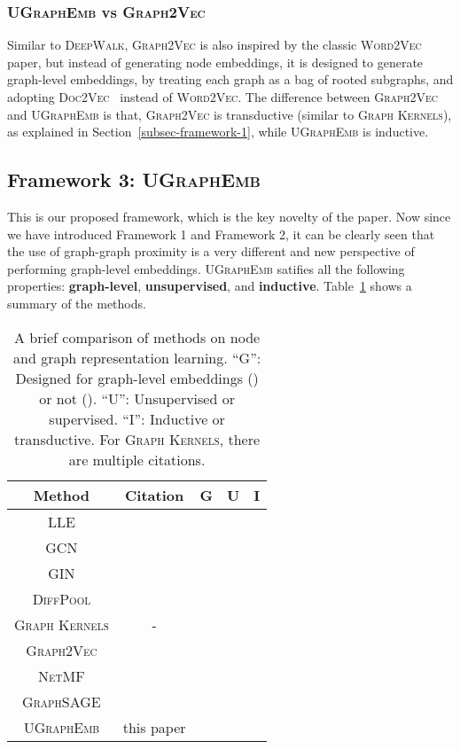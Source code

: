 \documentclass{article}
\newcommand{\model}{\textsc{UGraphEmb}\xspace}
\newcommand{\netmf}{\textsc{NetMF}\xspace}
\newcommand{\graphsage}{\textsc{GraphSAGE}\xspace}
\newcommand{\gk}{\textsc{Graph Kernels}\xspace}
\newcommand{\gv}{\textsc{Graph2Vec}\xspace}
\newcommand{\wv}{\textsc{Word2Vec}\xspace}
\newcommand{\gcn}{\textsc{GCN}\xspace}
\newcommand{\gin}{\textsc{GIN}\xspace}
\begin{document}
\subsubsection{\model vs \gv}

Similar to \textsc{DeepWalk}, \gv is also inspired by the classic \wv paper, but instead of generating node embeddings, it is designed to generate graph-level embeddings, by treating each graph as a bag of rooted subgraphs, and adopting \textsc{Doc2Vec}~\cite{mikolov2013distributed} instead of \wv. The difference between \gv and \model is that, \gv is transductive (similar to \gk), as explained in Section~\ref{subsec-framework-1}, while \model is inductive. 

\subsection{Framework 3: \model}

This is our proposed framework, which is the key novelty of the paper. Now since we have introduced Framework 1 and Framework 2, it can be clearly seen that the use of graph-graph proximity is a very different and new perspective of performing graph-level embeddings. \model satifies all the following properties: {\textbf{graph-level}}, {\textbf{unsupervised}}, and {\textbf{inductive}}. Table~\ref{table:baseline_summary} shows a summary of the methods.










\begin{table}[h]
\small
\vspace*{-2mm}
\begin{tabular}
    {ccccc} \hline
    \textbf{Method} & \textbf{Citation} & \textbf{G} & \textbf{U} & \textbf{I} \\ \hline
    \textsc{LLE} & \cite{belkin2003laplacian} &  &  &  \\ 
\gcn & \cite{kipf2016semi} &  &  &  \\ 
    \gin & \cite{xu2018powerful} &  &  &  \\ 
    \textsc{DiffPool} & \cite{ying2018hierarchical} &  &  &  \\ 
\hline
    \textsc{Graph Kernels} & - &  &  &  \\
    \gv & \cite{narayanan2017graph2vec} &  &  &  \\
\netmf & \cite{qiu2017network} &  &  &  \\ 
    \graphsage & \cite{hamilton2017inductive} &  &  &  \\
\hline
    \model & this paper &  &  &  \\
    \hline
\end{tabular}
\centering
\caption{
A brief comparison of methods on node and graph representation learning. ``G'': Designed for graph-level embeddings () or not (). ``U'': Unsupervised or supervised. ``I'': Inductive or transductive. For \gk, there are multiple citations.
}
\label{table:baseline_summary}
\vspace*{-4mm}
\end{table}
\end{document}

